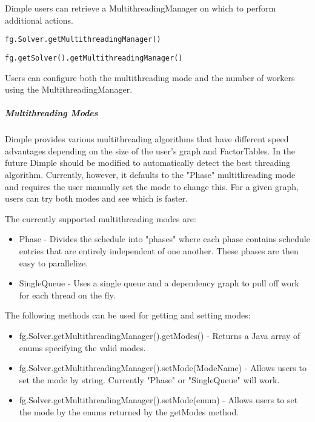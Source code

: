 
Dimple users can retrieve a MultithreadingManager on which to perform additional actions.

\ifmatlab
\begin{lstlisting}
fg.Solver.getMultithreadingManager()
\end{lstlisting}
\fi

\ifjava
\begin{lstlisting}
fg.getSolver().getMultithreadingManager()
\end{lstlisting}
\fi

Users can configure both the multithreading mode and the number of workers using the MultithreadingManager.

\subparagraph{Multithreading Modes}

Dimple provides various multithreading algorithms that have different speed advantages depending on the size of the user's graph and FactorTables.  In the future Dimple should be modified to automatically detect the best threading algorithm.  Currently, however, it defaults to the "Phase" multithreading mode and requires the user manually set the mode to change this.  For a given graph, users can try both modes and see which is faster.

The currently supported multithreading modes are:

\begin{itemize}
\item Phase - Divides the schedule into "phases" where each phase contains schedule entries that are entirely independent of one another.  These phases are then easy to parallelize.  
\item SingleQueue - Uses a single queue and a dependency graph to pull off work for each thread on the fly.  
\end{itemize}

The following methods can be used for getting and setting modes:


\ifmatlab

\begin{itemize}
\item fg.Solver.getMultithreadingManager().getModes() - Returns a Java array of enums specifying the valid modes.
\item fg.Solver.getMultithreadingManager().setMode(ModeName) - Allows users to set the mode by string.  Currently "Phase" or "SingleQueue" will work.
\item fg.Solver.getMultithreadingManager().setMode(enum) - Allows users to set the mode by the enums returned by the getModes method.
\end{itemize}

